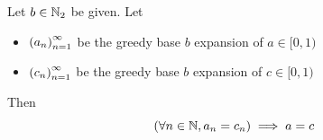 \bigskip

\begin{theorem} \label{an:thm:same-greedy-base-expansion-implies-equality}
    Let $b \in \N_{2}$ be given. Let
    \begin{itemize}
        \item $\paren*{a_{n}}_{n = 1}^{\infty}$ be the greedy base $b$ expansion of $a \in [0, 1)$
        \item $\paren*{c_{n}}_{n = 1}^{\infty}$ be the greedy base $b$ expansion of $c \in [0, 1)$
    \end{itemize}
    Then
    \[
    (\forall n \in \N, a_{n} = c_{n}) \implies a = c
    \]
\end{theorem}
